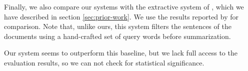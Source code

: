 \documentclass[a4paper,BCOR=10mm]{report}
\numberwithin{lemma}{chapter}
\numberwithin{definition}{chapter}
\begin{document}
Finally, we also compare our systems with the extractive system of \citet{chieu}, which we have described in section \ref{sec:prior-work}.
We use the results reported by \citet{markert} for comparison. Note that, unlike ours, this system filters the sentences of the documents using a hand-crafted set of query words before summarization.

Our system seems to outperform this baseline, but we lack full access to the evaluation results, so we can not check for statistical significance.

%
%
%
%
\end{document}

